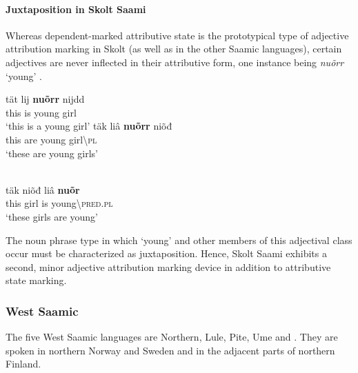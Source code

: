\paragraph*{Juxtaposition in Skolt Saami}
Whereas dependent\hyp{}marked attributive state is the prototypical type of adjective attribution marking in Skolt (as well as in the other Saamic languages), certain adjectives are never inflected in their attributive form, one instance being \textit{nuõrr} ‘young’ \citep[cf.~also][176]{feist2015a}.
\begin{exe}
\begin{xlist}
\begin{xlist}
\gll 	tät lij \textbf{nuõrr} nijdd\\
	this is young girl\\
\glt	‘this is a young girl’
\ex	
\gll	täk liâ \textbf{nuõrr} niõđ\\
	this are young girl\textbackslash\textsc{pl}\\
\glt	‘these are young girls’
\end{xlist}
\\
\gll	täk niõđ liâ \textbf{nuõr}\\
	this girl is young\textbackslash\textsc{pred.pl}\\
\glt	‘these girls are young’
\end{xlist}
\end{exe}
The noun phrase type in which ‘young’ and other members of this adjectival class occur must be characterized as {juxtaposition}. Hence, Skolt Saami exhibits a second, minor adjective attribution marking device in addition to attributive state marking.

\subsubsection{West Saamic}
The five West Saamic languages are Northern, Lule, Pite, Ume and . They are spoken in northern Norway and Sweden and in the adjacent parts of northern Finland.

